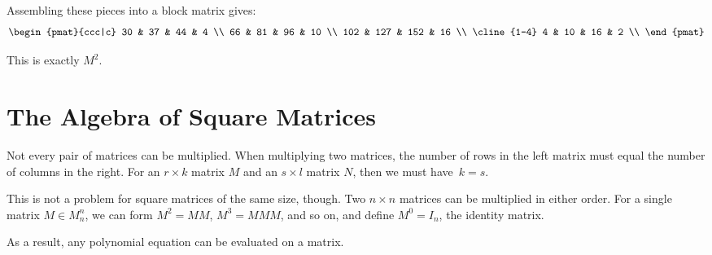 \begin{itemize}
Assembling these pieces into a block matrix gives:
\[
\begin{pmat}{ccc|c}
30 & 37 & 44 & 4 \\
66 & 81 & 96 & 10 \\
102 & 127 & 152 & 16 \\
\cline{1-4}
4 & 10 & 16 & 2 \\
\end{pmat}
\]

This is exactly $M^2$.
\end{itemize}

\section{The Algebra of Square Matrices }

Not every pair of matrices can be multiplied.  When multiplying two matrices, the number of rows in the left matrix must equal the number of columns in the right.  For an $r\times k$ matrix $M$ and an $s\times l$ matrix $N$, then we must have~$k=s$.

This is not a problem for square matrices of the same size, though.  Two $n\times n$ matrices can be multiplied in either order.  For a single matrix $M \in M^n_n$, we can form $M^2=MM$, $M^3=MMM$, and so on, and define $M^0=I_n$, the identity matrix.

As a result, any polynomial equation can be evaluated on a matrix.

